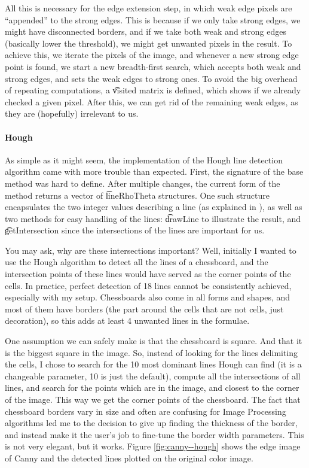 All this is necessary for the edge extension step, in which weak edge pixels are ``appended'' to the strong edges. This is because if we only take strong edges, we might have disconnected borders, and if we take both weak and strong edges (basically lower the threshold), we might get unwanted pixels in the result. To achieve this, we iterate the pixels of the image, and whenever a new strong edge point is found, we start a new breadth-first search, which accepts both weak and strong edges, and sets the weak edges to strong ones. To avoid the big overhead of repeating computations, a \t{visited} matrix is defined, which shows if we already checked a given pixel. After this, we can get rid of the remaining weak edges, as they are (hopefully) irrelevant to us.


\paragraph{Hough}

As simple as it might seem, the implementation of the Hough line detection algorithm came with more trouble than expected. First, the signature of the base method was hard to define. After multiple changes, the current form of the method returns a vector of \t{lineRhoTheta} structures. One such structure encapsulates the two integer values describing a line (as explained in ), as well as two methods for easy handling of the lines: \t{drawLine} to illustrate the result, and \t{getIntersection} since the intersections of the lines are important for us.

You may ask, why are these intersections important? Well, initially I wanted to use the Hough algorithm to detect all the lines of a chessboard, and the intersection points of these lines would have served as the corner points of the cells. In practice, perfect detection of 18 lines cannot be consistently achieved, especially with my setup. Chessboards also come in all forms and shapes, and most of them have borders (the part around the cells that are not cells, just decoration), so this adds at least 4 unwanted lines in the formulae.

One assumption we can safely make is that the chessboard is square. And that it is the biggest square in the image. So, instead of looking for the lines delimiting the cells, I chose to search for the 10 most dominant lines Hough can find (it is a changeable parameter, 10 is just the default), compute all the intersections of all lines, and search for the points which are in the image, and closest to the corner of the image. This way we get the corner points of the chessboard. The fact that chessboard borders vary in size and often are confusing for Image Processing algorithms led me to the decision to give up finding the thickness of the border, and instead make it the user's job to fine-tune the border width parameters. This is not very elegant, but it works. Figure \ref{fig:canny--hough} shows the edge image of Canny and the detected lines plotted on the original color image.


